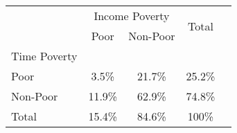 \begin{table} 
  \centering
  \begin{tabular}{lcccc}
    \toprule
    & \multicolumn{2}{c}{Income Poverty} & \multirow{2}{*}{Total} \\
                   & Poor   & Non-Poor &        \\
    \midrule
    Time Poverty   &        &          &        \\
    \quad Poor     & 3.5\% & 21.7\%   & 25.2\%  \\
    \quad Non-Poor & 11.9\% & 62.9\%   & 74.8\% \\
    \cmidrule{1-4}
    Total          & 15.4\% & 84.6\%   & 100\%  \\
    \bottomrule
  \end{tabular}
\end{table}